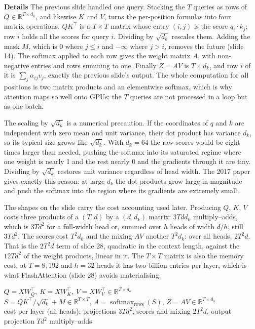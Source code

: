 \documentclass[11pt,letterpaper]{article}
\newcommand{\para}[1]{\medskip\noindent\textbf{#1}\quad}
\newenvironment{formulas}{\begin{tcolorbox}[formulabox]}{\end{tcolorbox}}
\newcommand{\dk}{d_k}
\DeclareMathOperator{\softmax}{softmax}
\begin{document}
\para{Details} The previous slide handled one query. Stacking the $T$ queries as rows of $Q\in\mathbb{R}^{T\times\dk}$, and likewise $K$ and $V$, turns the per-position formulas into four matrix operations. $QK^{\top}$ is a $T\times T$ matrix whose entry $(i,j)$ is the score $q_i\cdot k_j$; row $i$ holds all the scores for query $i$. Dividing by $\sqrt{\dk}$ rescales them. Adding the mask $M$, which is 0 where $j\le i$ and $-\infty$ where $j>i$, removes the future (slide 14). The softmax applied to each row gives the weight matrix $A$, with non-negative entries and rows summing to one. Finally $Z=AV$ is $T\times\dk$, and row $i$ of it is $\sum_j\alpha_{ij}v_j$, exactly the previous slide's output. The whole computation for all positions is two matrix products and an elementwise softmax, which is why attention maps so well onto GPUs: the $T$ queries are not processed in a loop but as one batch.

The scaling by $\sqrt{\dk}$ is a numerical precaution. If the coordinates of $q$ and $k$ are independent with zero mean and unit variance, their dot product has variance $\dk$, so its typical size grows like $\sqrt{\dk}$. With $\dk=64$ the raw scores would be eight times larger than needed, pushing the softmax into its saturated regime where one weight is nearly 1 and the rest nearly 0 and the gradients through it are tiny. Dividing by $\sqrt{\dk}$ restores unit variance regardless of head width. The 2017 paper gives exactly this reason: at large $\dk$ the dot products grow large in magnitude and push the softmax into the region where its gradients are extremely small.

The shapes on the slide carry the cost accounting used later. Producing $Q$, $K$, $V$ costs three products of a $(T,d)$ by a $(d,\dk)$ matrix: $3T d\dk$ multiply--adds, which is $3Td^2$ for a full-width head or, summed over $h$ heads of width $d/h$, still $3Td^2$. The scores cost $T^2\dk$ and the mixing $AV$ another $T^2\dk$: over all heads, $2T^2d$. That is the $2T^2d$ term of slide 28, quadratic in the context length, against the $12Td^2$ of the weight products, linear in it. The $T\times T$ matrix is also the memory cost: at $T=8{,}192$ and $h=32$ heads it has two billion entries per layer, which is what FlashAttention (slide 28) avoids materialising.

\begin{formulas}
$Q=XW_Q^{\top},\ K=XW_K^{\top},\ V=XW_V^{\top}\in\mathbb{R}^{T\times\dk}$\\[3pt]
$S=QK^{\top}/\sqrt{\dk}+M\in\mathbb{R}^{T\times T}$, \quad $A=\softmax_{\text{rows}}(S)$, \quad $Z=AV\in\mathbb{R}^{T\times\dk}$\\[3pt]
cost per layer (all heads): projections $3Td^2$, scores and mixing $2T^2d$, output projection $Td^2$ multiply--adds
\end{formulas}
\end{document}
